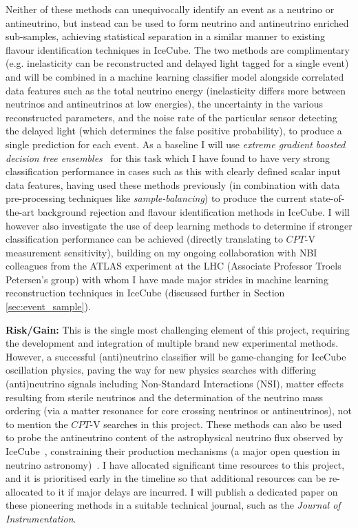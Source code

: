 \documentclass[a4paper,11pt]{article}
\begin{document}
Neither of these methods can unequivocally identify an event as a neutrino or antineutrino, but instead can be used to form neutrino and antineutrino enriched sub-samples, achieving statistical separation in a similar manner to existing flavour identification techniques in IceCube. The two methods are complimentary (e.g. inelasticity can be reconstructed and delayed light tagged for a single event) and will be combined in a machine learning classifier model alongside correlated data features such as the total neutrino energy (inelasticity differs more between neutrinos and antineutrinos at low energies), the uncertainty in the various reconstructed parameters, and the noise rate of the particular sensor detecting the delayed light (which determines the false positive probability), to produce a single prediction for each event. As a baseline I will use \textit{extreme gradient boosted decision tree ensembles}~\cite{Chen:2016btl} for this task which I have found to have very strong classification performance in cases such as this with clearly defined scalar input data features, having used these methods previously (in combination with data pre-processing techniques like \textit{sample-balancing}) to produce the current state-of-the-art background rejection and flavour identification methods in IceCube. I will however also investigate the use of deep learning methods to determine if stronger classification performance can be achieved (directly translating to $CPT$-V measurement sensitivity), building on my ongoing collaboration with NBI colleagues from the ATLAS experiment at the LHC (Associate Professor Troels Petersen's group) with whom I have made major strides in machine learning reconstruction techniques in IceCube (discussed further in Section \ref{sec:event_sample}).
 
\textbf{Risk/Gain:} This is the single most challenging element of this project, requiring the development and integration of multiple brand new experimental methods. However, a successful (anti)neutrino classifier will be game-changing for IceCube oscillation physics, paving the way for new physics searches with differing (anti)neutrino signals including Non-Standard Interactions (NSI), matter effects resulting from sterile neutrinos and the determination of the neutrino mass ordering (via a matter resonance for core crossing neutrinos or antineutrinos), not to mention the $CPT$-V searches in this project. These methods can also be used to probe the antineutrino content of the astrophysical neutrino flux observed by IceCube~\cite{Aartsen:2013jdh}, constraining their production mechanisms (a major open question in neutrino astronomy)~\cite{glashow_icecube}. I have allocated significant time resources to this project, and it is prioritised early in the timeline so that additional resources can be re-allocated to it if major delays are incurred. I will publish a dedicated paper on these pioneering methods in a suitable technical journal, such as the \textit{Journal of Instrumentation}. \\
\end{document}
